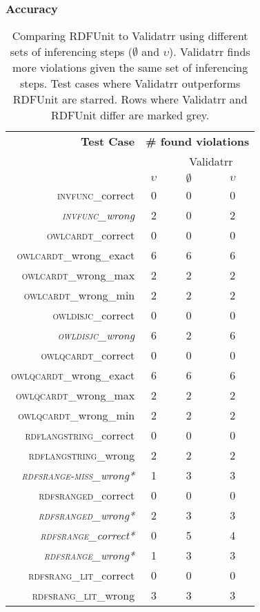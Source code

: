 \subsubsection{Accuracy}
\begin{table}
	\centering
	\caption{\small Comparing RDFUnit to Validatrr using different sets of inferencing steps ($\emptyset$ and $\upsilon$). %
		Validatrr finds more violations given the same set of inferencing steps. %
		Test cases where Validatrr outperforms RDFUnit are starred. Rows where Validatrr and RDFUnit differ are marked grey.}
	\label{table:unit-test}
	\footnotesize
	\begin{tabular}{rccc} \toprule
		\bf Test Case & \multicolumn{3}{c}{\textbf{\# found violations}} \\
		& \makecell{RDFUnit} & \multicolumn{2}{c}{Validatrr} \\
		& $\upsilon$ & $\emptyset$ & $\upsilon$ \\
		\hline
		{{\scshape invfunc}\_correct} & 0 & 0 & 0  \\ 
		\rowcolor{lightergrey} \textit{{\scshape invfunc}\_wrong} & 2 & 0 & 2 \\ 
		{{\scshape owlcardt}\_correct} & 0 & 0 & 0  \\ 
		{{\scshape owlcardt}\_wrong\_exact} & 6 & 6 & 6 \\ 
		{{\scshape owlcardt}\_wrong\_max} & 2 & 2 & 2  \\ 
		{{\scshape owlcardt}\_wrong\_min} & 2 & 2 & 2  \\ 
		{{\scshape owldisjc}\_correct} & 0 & 0 & 0  \\ 
		\rowcolor{lightergrey} \textit{{\scshape owldisjc}\_wrong} & 6 & 2 & 6  \\ 
		{{\scshape owlqcardt}\_correct} & 0 & 0 & 0  \\ 
		{{\scshape owlqcardt}\_wrong\_exact} & 6 & 6 & 6 \\ 
		{{\scshape owlqcardt}\_wrong\_max} & 2 & 2 & 2  \\ 
		{{\scshape owlqcardt}\_wrong\_min} & 2 & 2 & 2  \\ 
		{{\scshape rdflangstring}\_correct} & 0 & 0 & 0  \\ 
		{\scshape rdflangstring}\_wrong & 2 & 2 & 2 \\ 
		\rowcolor{lightergrey} \textit{{\scshape rdfsrange-miss}\_wrong*} & 1 & 3 & 3  \\ 
		{{\scshape rdfsranged}\_correct} & 0 & 0 & 0  \\ 
		\rowcolor{lightergrey} \textit{{\scshape rdfsranged}\_wrong*} & 2 & 3 & 3  \\ 
		\rowcolor{lightergrey} \textit{{\scshape rdfsrange}\_correct*} & 0 & 5 & 4  \\ 
		\rowcolor{lightergrey} \textit{{\scshape rdfsrange}\_wrong*} & 1 & 3 & 3  \\ 
		{\scshape rdfsrang\_lit}\_correct & 0 & 0 & 0 \\ 
		{\scshape rdfsrang\_lit}\_wrong & 3 & 3 & 3  \\
		\bottomrule 
	\end{tabular} 
\end{table}
